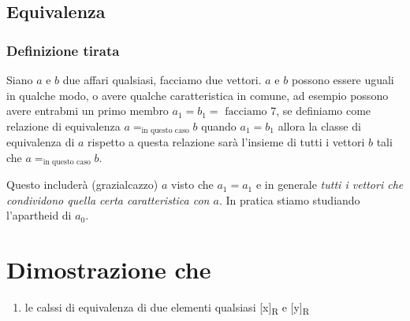 \documentclass[11pt]{article}
\begin{document}
\subsection{Equivalenza}
\label{sec:orgc2cc495}
\subsubsection{Definizione tirata}
\label{sec:org3373e2e}
Siano \(a\) e \(b\) due affari qualsiasi, facciamo due vettori.
\(a\) e \(b\) possono essere uguali in qualche modo, o avere qualche
caratteristica in comune, ad esempio possono avere entrabmi un primo
membro \(a_1 = b_1 = \text{ facciamo } 7\), se definiamo come relazione di
equivalenza \(a =_{\text{in questo caso}} b\) quando \(a_1 = b_1\) allora la classe
di equivalenza di \(a\) rispetto a questa relazione sarà l'insieme di tutti
i vettori \(b\) tali che \(a =_{\text{in questo caso}} b\).

Questo includerà (grazialcazzo) \(a\) visto che \(a_1 = a_1\) e in generale
\emph{tutti i vettori che condividono quella certa caratteristica con \(a\)}.
In pratica stiamo studiando l'apartheid di \(a_0\).

\section{Dimostrazione che}
\label{sec:orgf64b7b6}
\begin{enumerate}
\item le calssi di equivalenza di due elementi qualsiasi [x]\textsubscript{R} e [y]\textsubscript{R}
\end{enumerate}
\end{document}
